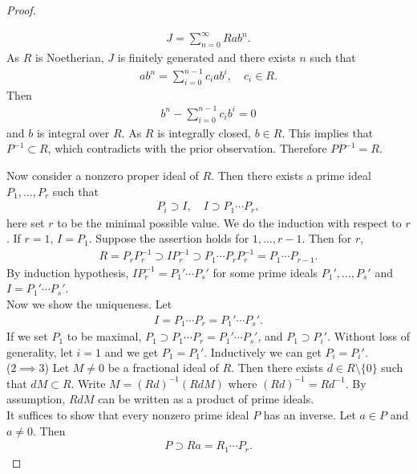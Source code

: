 \documentclass[12pt]{article}
\theoremstyle{plain}
\theoremstyle{remark}
\theoremstyle{definition}
\begin{document}
\begin{proof}
\begin{itemize}
        \begin{align*}
            J = \sum_{n=0}^\infty Rab^n.
        \end{align*}
        As $R$ is Noetherian, $J$ is finitely generated and there exists $n$ such that
        \begin{align*}
            ab^n = \sum_{i=0}^{n-1}c_i ab^i,\quad c_i\in R.
        \end{align*}
        Then 
        \begin{align*}
            b^n-\sum_{i=0}^{n-1}c_i b^i = 0
        \end{align*}
        and $b$ is integral over $R$. As $R$ is integrally closed, $b\in R$. This implies that $P^{-1}\subset R$, which contradicts with the prior observation. Therefore $PP^{-1}=R$.
    \end{itemize}
    Now consider a nonzero proper ideal of $R$. Then there exists a prime ideal $P_1,\dots,P_r$ such that
    \begin{align*}
        P_i\supset I,\quad I\supset P_1\cdots P_r,
    \end{align*}
    here set $r$ to be the minimal possible value. We do the induction with respect to $r$. If $r=1$, $I=P_1$. Suppose the assertion holds for $1,\dots,r-1$. Then for $r$,
    \begin{align*}
        R=P_rP_r^{-1}\supset IP_r^{-1}\supset P_1\cdots P_rP_r^{-1}=P_1\cdots P_{r-1}.
    \end{align*}
    By induction hypothesis, $IP_r^{-1} = P_1'\cdots P_s'$ for some prime ideals $P_1',\dots,P_s'$ and $I=P_1'\cdots P_s'$.\\
    Now we show the uniqueness. Let
    \begin{align*}
        I=P_1\cdots P_r = P_1'\cdots P_s'.
    \end{align*}
    If we set $P_1$ to be maximal, $P_1\supset P_1\cdots P_r = P_1'\cdots P_s'$, and $P_1\supset P_i'$. Without loss of generality, let $i=1$ and we get $P_1=P_1'$. Inductively we can get $P_i=P_i'$.\\
    ($2\implies 3$) Let $M\neq 0$ be a fractional ideal of $R$. Then there exists $d\in R\setminus\{0\}$ such that $dM\subset R$. Write $M=(Rd)^{-1}(RdM)$ where $(Rd)^{-1} = Rd^{-1}$. By assumption, $RdM$ can be written as a product of prime ideals. \\
    It suffices to show that every nonzero prime ideal $P$ has an inverse. Let $a\in P$ and $a\neq 0$. Then
    \begin{align*}
        P\supset Ra = R_1\cdots P_r.

\end{align*}
\end{proof}
\end{document}
